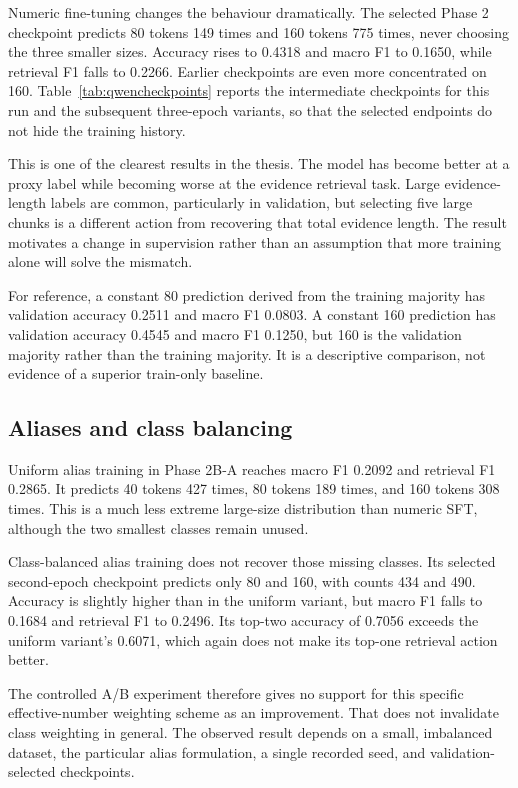 Numeric fine-tuning changes the behaviour dramatically. The selected
Phase 2 checkpoint predicts 80 tokens 149 times and 160 tokens 775
times, never choosing the three smaller sizes. Accuracy rises to
0.4318 and macro F1 to 0.1650, while retrieval F1 falls to 0.2266.
Earlier checkpoints are even more concentrated on 160.
Table~\ref{tab:qwencheckpoints} reports the intermediate checkpoints
for this run and the subsequent three-epoch variants, so that the
selected endpoints do not hide the training history.

This is one of the clearest results in the thesis. The model has
become better at a proxy label while becoming worse at the evidence
retrieval task. Large evidence-length labels are common, particularly
in validation, but selecting five large chunks is a different action
from recovering that total evidence length. The result motivates a
change in supervision rather than an assumption that more training
alone will solve the mismatch.

For reference, a constant 80 prediction derived from the training
majority has validation accuracy 0.2511 and macro F1 0.0803. A
constant 160 prediction has validation accuracy 0.4545 and macro
F1 0.1250, but 160 is the validation majority rather than the
training majority. It is a descriptive comparison, not evidence
of a superior train-only baseline.

\subsection{Aliases and class balancing}
Uniform alias training in Phase 2B-A reaches macro F1 0.2092 and
retrieval F1 0.2865. It predicts 40 tokens 427 times, 80 tokens
189 times, and 160 tokens 308 times. This is a much less extreme
large-size distribution than numeric SFT, although the two smallest
classes remain unused.

Class-balanced alias training does not recover those missing classes.
Its selected second-epoch checkpoint predicts only 80 and 160, with
counts 434 and 490. Accuracy is slightly higher than in the uniform
variant, but macro F1 falls to 0.1684 and retrieval F1 to 0.2496.
Its top-two accuracy of 0.7056 exceeds the uniform variant's 0.6071,
which again does not make its top-one retrieval action better.

The controlled A/B experiment therefore gives no support for this
specific effective-number weighting scheme as an improvement. That
does not invalidate class weighting in general. The observed result
depends on a small, imbalanced dataset, the particular alias
formulation, a single recorded seed, and validation-selected
checkpoints.

